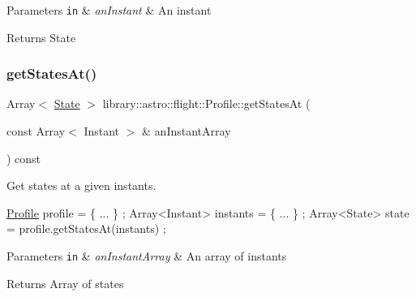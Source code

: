 \begin{DoxyParams}[1]{Parameters}
\mbox{\tt in}  & {\em an\+Instant} & An instant \\
\hline
\end{DoxyParams}
\begin{DoxyReturn}{Returns}
State 
\end{DoxyReturn}
\mbox{\label{classlibrary_1_1astro_1_1flight_1_1_profile_a20972a5b1104ed335d995c5a02db5db7}} 
\subsubsection{\texorpdfstring{get\+States\+At()}{getStatesAt()}}
{\footnotesize\ttfamily Array$<$ \hyperlink{classlibrary_1_1astro_1_1flight_1_1profile_1_1_state}{State} $>$ library\+::astro\+::flight\+::\+Profile\+::get\+States\+At (\begin{DoxyParamCaption}\item[{const Array$<$ Instant $>$ \&}]{an\+Instant\+Array }\end{DoxyParamCaption}) const}



Get states at a given instants. 


\begin{DoxyCode}
\hyperlink{classlibrary_1_1astro_1_1flight_1_1_profile_a34d66fdddf3eda9a3fed036d6b9a4363}{Profile} profile = \{ ... \} ;
Array<Instant> instants = \{ ... \} ;
Array<State> state = profile.getStatesAt(instants) ;
\end{DoxyCode}



\begin{DoxyParams}[1]{Parameters}
\mbox{\tt in}  & {\em an\+Instant\+Array} & An array of instants \\
\hline
\end{DoxyParams}
\begin{DoxyReturn}{Returns}
Array of states 
\end{DoxyReturn}
\mbox{\label{classlibrary_1_1astro_1_1flight_1_1_profile_a03292340098b9dffc758ae0e000d1f2b}} 
